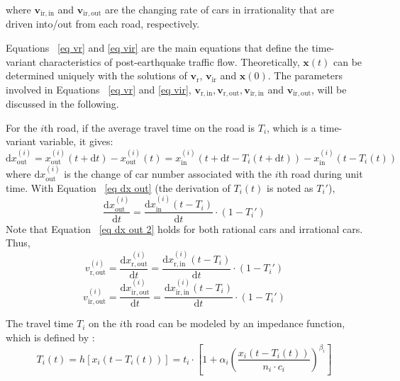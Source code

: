 \documentclass[review,11pt,nonatbib]{elsarticle}
\begin{document}
where $\mathbf{v}_{\mathrm{ir,in}} $ and $\mathbf{v}_{\mathrm{ir,out}}$ are the changing rate of cars in irrationality that are driven into/out from each road, respectively.
\par Equations ~\eqref{eq vr} and \eqref{eq vir} are the main equations that define the time-variant characteristics of post-earthquake traffic flow. Theoretically, $\mathbf{x}(t)$ can be determined uniquely with the solutions of $\mathbf{v}_{\mathrm{r}}$, $\mathbf{v}_{\mathrm{ir}}$ and $\mathbf{x}(0)$. The parameters involved in Equations ~\eqref{eq vr} and \eqref{eq vir}, $\mathbf{v}_{\mathrm{r,in}}, \mathbf{v}_{\mathrm{r,out}},\mathbf{v}_{\mathrm{ir,in}}$ and $\mathbf{v}_{\mathrm{ir,out}}$, will be discussed in the following.
\par For the $i$th road, if the average travel time on the road is $T_i$, which is a time-variant variable, it gives:
\begin{equation}\label{eq dx out}
\mathrm{d}x_{\mathrm{out}}^{(i)} = x_{\mathrm{out}}^{(i)}(t+\mathrm{d}t)- x_{\mathrm{out}}^{(i)}(t) =
                               x_{\mathrm{in}}^{(i)}(t+\mathrm{d}t-T_i(t+\mathrm{d}t)) - x_{\mathrm{in}}^{(i)}(t - T_i(t))
\end{equation}
where $\mathrm{d}x_{\mathrm{out}}^{(i)}$ is the change of car number associated with the $i$th road during unit time. With Equation ~\eqref{eq dx out} (the derivation of $T_i(t)$ is noted as $T_i'$),
\begin{equation}\label{eq dx out 2}
\frac{\mathrm{d}x_{\mathrm{out}}^{(i)}}{\mathrm{d}t} = \frac{\mathrm{d}x_{\mathrm{in}}^{(i)}(t-T_i)}{\mathrm{d}t}\cdot\left(1-T_i'\right)
\end{equation}
Note that Equation ~\eqref{eq dx out 2} holds for both rational cars and irrational cars. Thus,
\begin{equation}\label{eq vr out}
v_{\mathrm{r,out}}^{(i)} =
\frac{\mathrm{d}x_{\mathrm{r,out}}^{(i)}}{\mathrm{d}t} = \frac{\mathrm{d}x_{\mathrm{r,in}}^{(i)}(t-T_i)}{\mathrm{d}t}\cdot\left(1-T_i'\right)
\end{equation}
\begin{equation}\label{eq vir out}
v_{\mathrm{ir,out}}^{(i)} =
\frac{\mathrm{d}x_{\mathrm{ir,out}}^{(i)}}{\mathrm{d}t} = \frac{\mathrm{d}x_{\mathrm{ir,in}}^{(i)}(t-T_i)}{\mathrm{d}t}\cdot\left(1-T_i'\right)
\end{equation}
\par The travel time $T_i$ on the $i$th road can be modeled by an impedance function, which is defined by \citep{Branston1976Link}:
\begin{equation}\label{eq bpr}
T_i(t)=h[x_i(t-T_i(t))]=t_i\cdot\left[1+\alpha_i\left(\frac{x_i(t-T_i(t))}{n_i\cdot c_i}\right)^{\beta_i}\right]
\end{equation}
\end{document}
